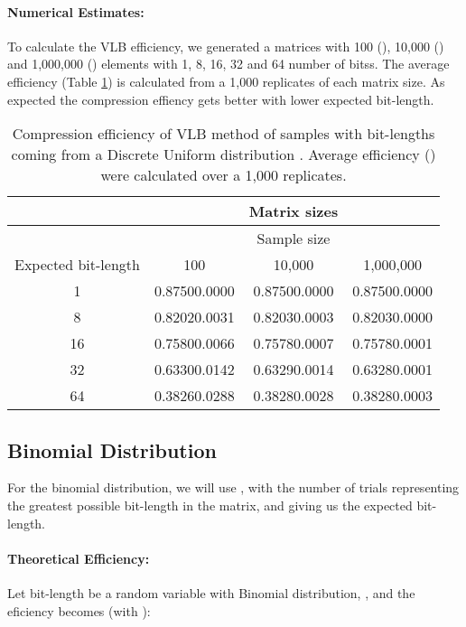 \documentclass[10pt]{article}
\begin{document}
\paragraph{Numerical Estimates:}
To calculate the VLB efficiency, we generated a matrices with 100 (), 10,000 () and 1,000,000 () elements with 1, 8, 16, 32 and 64 number of bitss.  The average efficiency (Table \ref{tab:03}) is calculated from a 1,000 replicates of each matrix size. As expected the compression effiency gets better with lower expected bit-length.

\begin{table}[h]
  \centering
  \caption{Compression efficiency of VLB method of samples with bit-lengths coming from a Discrete Uniform distribution . Average efficiency () were calculated over a 1,000 replicates.}
 \begin{tabular}{cccc}
    \hline
    & &Matrix sizes& \\
    \hline
    & &Sample size & \\
    Expected bit-length & 100 & 10,000 & 1,000,000 \\
    \hline
     1&0.87500.0000& 0.87500.0000&0.87500.0000\\ 
     8&0.82020.0031& 0.82030.0003&0.82030.0000\\ 
     16&0.75800.0066& 0.75780.0007&0.75780.0001\\ 
     32&0.63300.0142& 0.63290.0014&0.63280.0001\\ 
     64&0.38260.0288& 0.38280.0028&0.38280.0003\\ 
    \hline
 \end{tabular}
 \label{tab:03}
\end{table}

\subsection*{Binomial Distribution}

For the binomial distribution, we will use , with the number of trials  representing the greatest possible bit-length in the matrix, and  giving us the expected bit-length.

\paragraph{Theoretical Efficiency:}
Let bit-length  be a random variable with Binomial distribution, ,  and the eficiency becomes (with ):
\end{document}
